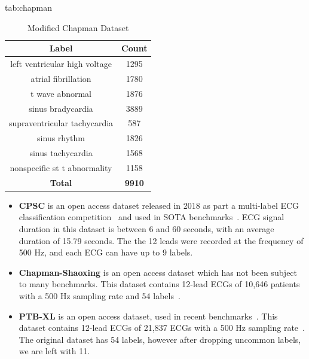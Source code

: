 \documentclass[pmlr,twocolumn]{jmlr}%
\begin{document}
\begin{table}[tbp]
\floatconts
  {tab:chapman}%
  {\caption{Modified Chapman Dataset}}%
  {
    \begin{tabular}{|c|c|}
     \hline
    Label & Count \\
     \hline
    left ventricular high voltage &  1295 \\
    atrial fibrillation           &  1780 \\
    t wave abnormal               &  1876 \\
    sinus bradycardia             &  3889 \\
    supraventricular tachycardia  &   587 \\
    sinus rhythm                  &  1826 \\
    sinus tachycardia             &  1568 \\
    nonspecific st t abnormality  &  1158 \\
     \hline
    \textbf{Total} & \textbf{9910}\\
    \hline
    \end{tabular}
  }
\end{table}

\begin{itemize}
    \item \textbf{CPSC} is an open access  dataset released in 2018 as part a multi-label ECG classification competition~\cite{liu2018open} and used in SOTA benchmarks~\cite{strodthoff2020deep}. ECG signal duration in this dataset is between 6 and 60 seconds, with an average duration of 15.79 seconds. The the 12 leads were recorded at the frequency of 500 Hz, and each ECG can have up to 9 labels.
    \item \textbf{Chapman-Shaoxing} is an open access dataset which has not been subject to many benchmarks. This dataset contains 12-lead ECGs of 10,646 patients with a 500 Hz sampling rate and 54 labels~\cite{zheng202012}.
    \item \textbf{PTB-XL} is an open access dataset, used in recent benchmarks~\cite{strodthoff2020deep}. This dataset contains 12-lead ECGs of 21,837 ECGs with a 500 Hz sampling rate~\cite{zheng202012}. The original dataset has 54 labels, however after dropping uncommon labels, we are left with 11. 
\end{itemize}
\end{document}
